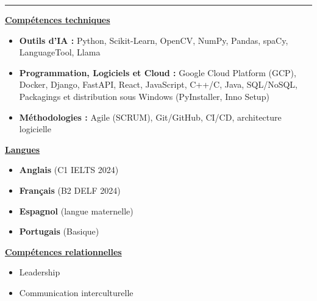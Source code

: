 \documentclass[letterpaper,8pt]{extarticle}
\begin{document}
  

\vspace{4pt}
\noindent\rule{\textwidth}{0.4pt}
\vspace{0.4pt}

\noindent
\begin{minipage}[t]{0.39\textwidth}
  \raggedright
  \textbf{\underline{Compétences techniques}}\\[-2pt]
  {\scriptsize
    \begin{itemize}[leftmargin=*,itemsep=1pt,parsep=0pt,topsep=0pt,partopsep=0pt]
      \item \textbf{Outils d'IA :} Python, Scikit-Learn, OpenCV, NumPy, 
        Pandas, spaCy, LanguageTool, Llama
      \item \textbf{Programmation, Logiciels et Cloud :} Google Cloud Platform (GCP), Docker, Django, FastAPI, 
        React, JavaScript, C++/C, Java, SQL/NoSQL, Packagings et distribution sous Windows (PyInstaller, Inno Setup)
      \item \textbf{Méthodologies :} Agile (SCRUM), Git/GitHub, CI/CD, architecture logicielle
    \end{itemize}
  }
\end{minipage}\hfill
\begin{minipage}[t]{0.28\textwidth}
  \raggedright
  \textbf{\underline{Langues}}\\[-2pt]
  {\scriptsize
    \begin{itemize}[leftmargin=*,itemsep=0pt,parsep=0pt,topsep=0pt,partopsep=0pt]
      \item \textbf{Anglais} (C1 \textendash{} IELTS 2024)
      \item \textbf{Français} (B2 \textendash{} DELF 2024)
      \item \textbf{Espagnol} (langue maternelle)
      \item \textbf{Portugais} (Basique)
    \end{itemize}
  }

  \vspace{0.12cm}
  \textbf{\underline{Compétences relationnelles}}\\[-2pt]
  {\scriptsize
    \begin{itemize}[leftmargin=*,itemsep=1pt,parsep=0pt,topsep=0pt,partopsep=0pt]
      \item Leadership
      \item Communication interculturelle
    \end{itemize}
  }
\end{minipage}\hfill
\end{document}
